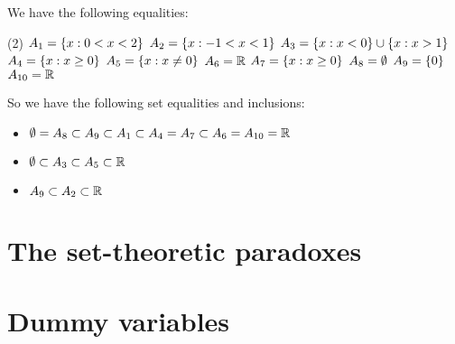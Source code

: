 \begin{solution}
We have the following equalities:
\begin{tasks}[label=](2)
    \task $A_1=\left\{ x : 0 < x <2 \right\}$
    \task $A_2=\left\{ x : -1 < x < 1 \right\}$
    \task $A_3=\left\{ x : x < 0 \right\}\cup \left\{ x : x > 1 \right\}$
    \task $A_4=\left\{ x : x\geq 0 \right\}$
    \task $A_5=\left\{ x : x\neq 0 \right\}$
    \task $A_6=\mathbb{R}$
    \task $A_7=\left\{ x : x\geq 0 \right\}$
    \task $A_8=\emptyset$
    \task $A_9=\left\{0\right\}$
    \task $A_{10}=\mathbb{R}$
\end{tasks}

So we have the following set equalities and inclusions:
\begin{itemize}
    \item $\emptyset = A_8 \subset A_9 \subset A_1 \subset A_4 = A_7 \subset A_6 = A_{10} = \mathbb{R}$
    \item $\emptyset \subset A_3 \subset A_5 \subset \mathbb{R}$
    \item $A_9 \subset A_2 \subset \mathbb{R}$
\end{itemize}
\end{solution}




\section{The set-theoretic paradoxes}
\section{Dummy variables}
